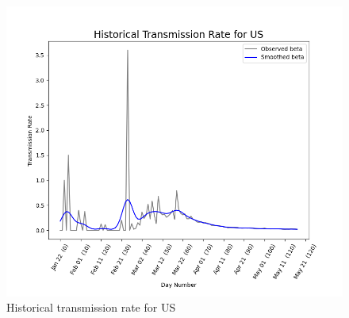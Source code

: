 \documentclass[11pt]{article}
\begin{document}
\begin{figure}[h]
    \includegraphics[width=16cm]{images/historical-transmission-rate-US.png}
    \centering
    \caption{Historical transmission rate for US}
    \label{fig:historical-transmission-rate-us}
\end{figure}
\end{document}
